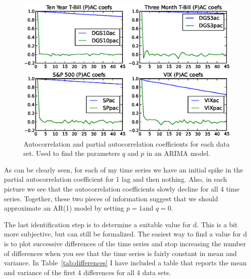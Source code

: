 \documentclass[a4paper, 11pt]{article}
\theoremstyle{definition} %
\numberwithin{equation}{section}
\begin{document}
    \begin{figure}[!h]
        \centering
        \includegraphics[width=6in]{./Figures/all_corrs.eps}
        \caption{\small Autocorrelation and partial autocorrelation coefficients for each data set. Used to find the parameters $q$ and $p$ in an ARIMA model.}
        \label{fig:correlations}
    \end{figure}

    As can be clearly seen, for each of my time series we have an initial spike in the partial autocorrelation coefficient for 1 lag and then nothing. Also, in each picture we see that the autocorrelation coefficients slowly decline for all 4 time series. Together, these two pieces of information suggest that we should approximate an AR(1) model by setting $p = 1 $and $q = 0$.

    The last identification step is to determine a suitable value for d. This is a bit more subjective, but can still be formalized. The easiest way to find a value for d is to plot successive differences of the time series and stop increasing the number of differences when you see that the time series is fairly constant in mean and variance. In Table~\ref{tab:differences} I have included a table that reports the mean and variance of the first 4 differences for all 4 data sets.
\end{document}
